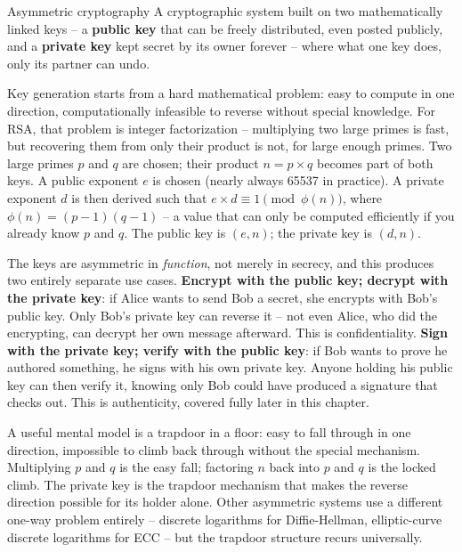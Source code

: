 \begin{definition}{Asymmetric cryptography}
A cryptographic system built on two mathematically linked keys -- a \textbf{public key} that can be
freely distributed, even posted publicly, and a \textbf{private key} kept secret by its owner
forever -- where what one key does, only its partner can undo.
\end{definition}

Key generation starts from a hard mathematical problem: easy to compute in one direction,
computationally infeasible to reverse without special knowledge. For RSA, that problem is integer
factorization -- multiplying two large primes is fast, but recovering them from only their product is
not, for large enough primes. Two large primes $p$ and $q$ are chosen; their product $n = p \times q$
becomes part of both keys. A public exponent $e$ is chosen (nearly always 65537 in practice).
A private exponent $d$ is then derived such that $e \times d \equiv 1 \pmod{\phi(n)}$, where
$\phi(n) = (p-1)(q-1)$ -- a value that can only be computed efficiently if you already know $p$ and
$q$. The public key is $(e, n)$; the private key is $(d, n)$.

The keys are asymmetric in \emph{function}, not merely in secrecy, and this produces two entirely
separate use cases. \textbf{Encrypt with the public key; decrypt with the private key}: if Alice
wants to send Bob a secret, she encrypts with Bob's public key. Only Bob's private key can
reverse it -- not even Alice, who did the encrypting, can decrypt her own message afterward. This is
confidentiality. \textbf{Sign with the private key; verify with the public key}: if Bob wants to
prove he authored something, he signs with his own private key. Anyone holding his public key
can then verify it, knowing only Bob could have produced a signature that checks out. This is
authenticity, covered fully later in this chapter.

\begin{example}
A useful mental model is a trapdoor in a floor: easy to fall through in one direction, impossible to
climb back through without the special mechanism. Multiplying $p$ and $q$ is the easy fall; factoring
$n$ back into $p$ and $q$ is the locked climb. The private key is the trapdoor mechanism that
makes the reverse direction possible for its holder alone. Other asymmetric systems use a different
one-way problem entirely -- discrete logarithms for Diffie-Hellman, elliptic-curve discrete logarithms
for ECC -- but the trapdoor structure recurs universally.
\end{example}

